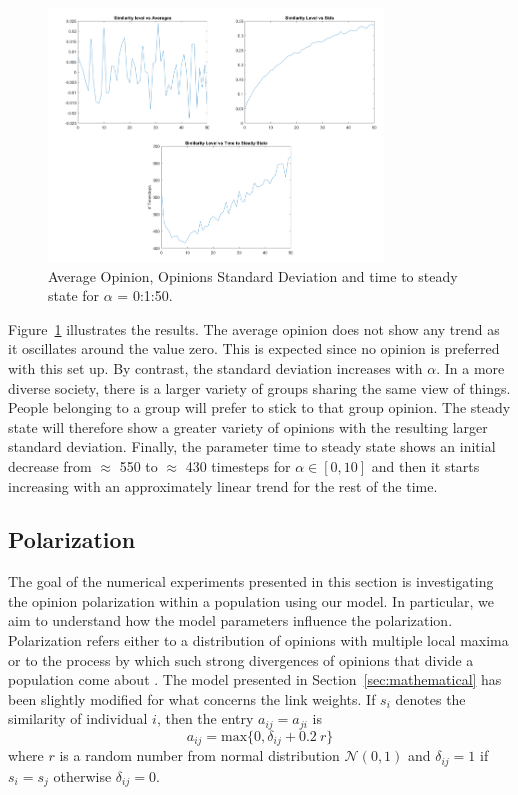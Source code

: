 \begin{figure}[!t]
	\centering
	\includegraphics[width=3.5in]{Figures/diversity_results.png}
	\caption{Average Opinion, Opinions Standard Deviation and time to steady state for $\alpha$ = 0:1:50.}
	\label{pics:diversityresults}
\end{figure}
Figure~\ref{pics:diversityresults} illustrates the results. The average opinion does not show any trend as it oscillates around the value zero. This is expected since no opinion is preferred with this set up. By contrast, the standard deviation increases with $\alpha$. In a more diverse society, there is a larger variety of groups sharing the same view of things. People belonging to a group will prefer to stick to that group opinion. The steady state will therefore show a greater variety of opinions with the resulting larger standard deviation. Finally, the parameter time to steady state shows an initial decrease from $\approx$ 550 to $\approx$ 430 timesteps for $\alpha \in [0,10]$ and then it starts increasing with an approximately linear trend for the rest of the time. 
\subsection{Polarization}

The goal of the numerical experiments presented in this section is investigating the opinion polarization within a population using our model. In particular, we aim to understand how the model parameters influence the polarization. 
Polarization refers either to a distribution of opinions with multiple local maxima or to the process by which such strong divergences of opinions that divide a population come about \cite{Banisch2019}\cite{Bramsona2016}. The model presented in Section~\ref{sec:mathematical} has been slightly modified for what concerns the link weights. If $s_i$ denotes the similarity of individual $i$, then the entry $a_{ij} = a_{ji}$ is 
\begin{equation}
a_{ij} = \text{max}\{0, \delta_{ij} + 0.2\ r\}
\end{equation}
where $r$ is a random number from normal distribution $\mathcal{N}(0,1)$ and $\delta_{ij} = 1$ if $s_i = s_j$ otherwise $\delta_{ij} = 0$. 

